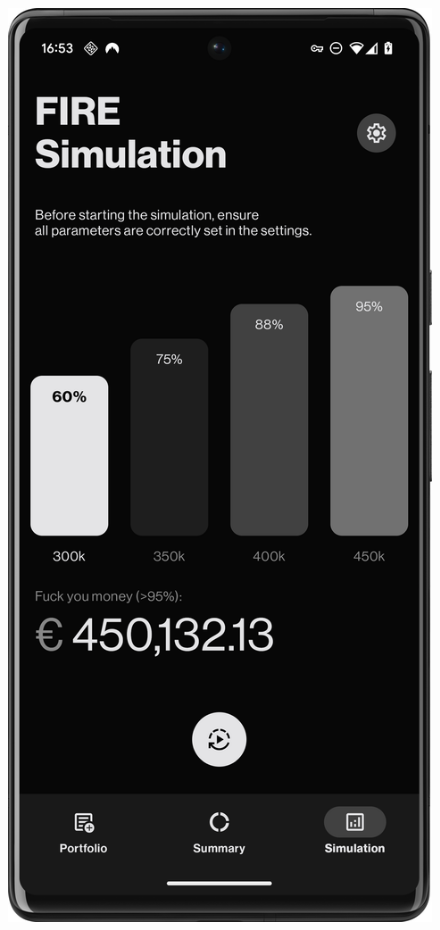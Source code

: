 \begin{figure}[H]
    \centering
    \begin{minipage}{0.24\textwidth}
        \centering
        \includegraphics[width=\textwidth]{foto/simulation_screen}

\end{minipage}
\end{figure}
